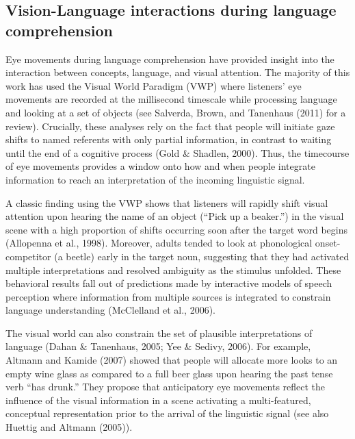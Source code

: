 \documentclass[english,floatsintext,man]{apa6}
\begin{document}
\hypertarget{vision-language-interactions-during-language-comprehension}{%
\subsection{Vision-Language interactions during language
comprehension}\label{vision-language-interactions-during-language-comprehension}}

Eye movements during language comprehension have provided insight into
the interaction between concepts, language, and visual attention. The
majority of this work has used the Visual World Paradigm (VWP) where
listeners' eye movements are recorded at the millisecond timescale while
processing language and looking at a set of objects (see Salverda,
Brown, and Tanenhaus (2011) for a review). Crucially, these analyses
rely on the fact that people will initiate gaze shifts to named
referents with only partial information, in contrast to waiting until
the end of a cognitive process (Gold \& Shadlen, 2000). Thus, the
timecourse of eye movements provides a window onto how and when people
integrate information to reach an interpretation of the incoming
linguistic signal.

A classic finding using the VWP shows that listeners will rapidly shift
visual attention upon hearing the name of an object (\enquote{Pick up a
beaker.}) in the visual scene with a high proportion of shifts occurring
soon after the target word begins (Allopenna et al., 1998). Moreover,
adults tended to look at phonological onset-competitor (a beetle) early
in the target noun, suggesting that they had activated multiple
interpretations and resolved ambiguity as the stimulus unfolded. These
behavioral results fall out of predictions made by interactive models of
speech perception where information from multiple sources is integrated
to constrain language understanding (McClelland et al., 2006).

The visual world can also constrain the set of plausible interpretations
of language (Dahan \& Tanenhaus, 2005; Yee \& Sedivy, 2006). For
example, Altmann and Kamide (2007) showed that people will allocate more
looks to an empty wine glass as compared to a full beer glass upon
hearing the past tense verb \enquote{has drunk.} They propose that
anticipatory eye movements reflect the influence of the visual
information in a scene activating a multi-featured, conceptual
representation prior to the arrival of the linguistic signal (see also
Huettig and Altmann (2005)).
\end{document}
